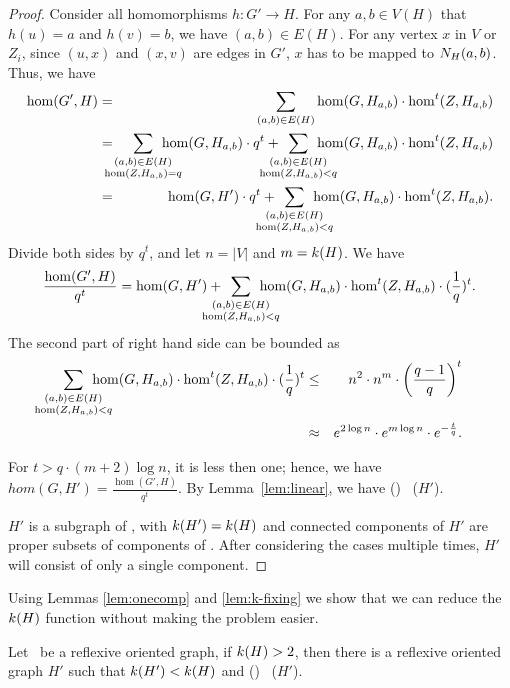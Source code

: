\begin{proof}
Consider all homomorphisms \(h: G'\to H\)\@.
For any \(a,b\in V(H)\) that \(h(u)=a\) and \(h(v)=b\), we have \((a,b)\in E(H)\)\@.
For any vertex \(x\) in \(V\) or \(Z_i\), since \((u,x)\) and \((x,v)\) are edges in \(G'\), 
\(x\) has to be mapped to \(N_{H}({a},{b})\)\@. Thus, we have
\begin{eqnarray*}
\hom(G',H) &=&
\sum_{(a,b)\in E(H)} \hom(G,H_{a,b}) \cdot \hom^t(Z, H_{a,b}) \\
&=&
\bigsum{\substack{(a,b)\in E(H)\\ \hom(Z, H_{a,b}) = q}} \hom(G, H_{a,b}) \cdot q^t + 
\bigsum{\substack{(a,b)\in E(H)\\ \hom(Z, H_{a,b}) < q}} 
\hom(G, H_{a,b}) \cdot \hom^t(Z,H_{a,b})\\
&=&
\hom(G,H') \cdot q^t + \bigsum{\substack{(a,b)\in E(H)\\ \hom(Z, H_{a,b}) < q}} 
\hom(G, H_{a,b}) \cdot \hom^t(Z,H_{a,b}).
\end{eqnarray*}
Divide both sides by \(q^t\), and let \(n=|V|\) and \(m=k(H)\)\@. We have
\[
\frac{\hom(G',H)}{q^t} = 
\hom(G,H') + 
\bigsum{\substack{(a,b)\in E(H)\\ \hom(Z, H_{a,b}) < q}} 
\hom(G, H_{a,b}) \cdot \hom^t(Z,H_{a,b}) \cdot (\frac{1}{q})^t.
\]
The second part of right hand side can be bounded as
\begin{eqnarray*}
\bigsum{\substack{(a,b)\in E(H)\\ \hom(Z, H_{a,b}) < q}} 
\hom(G, H_{a,b}) \cdot \hom^t(Z,H_{a,b}) \cdot (\frac{1}{q})^t & \le &
n^2 \cdot n^m \cdot \left(\frac{q-1}{q}\right)^t\\
& \approx & e ^ {2\log n} \cdot e^{m\log n} \cdot e^{-\frac{t}{q}}.\\
\end{eqnarray*}

For \(t > q \cdot (m+2)\log n\), it is less then one; hence, we have
\(hom(G,H')=\frac{\hom(G',H)}{q^t}\)\@. By Lemma~\ref{lem:linear},
we have \chom(\mH) \mapge\ \chom(\(H'\)). 

\(H'\) is a subgraph of \mH, with \(k(H')=k(H)\) and connected components of \(H'\)
are proper subsets of components of \mH\@. After considering the cases multiple times,
\(H'\) will consist of only a single component.
\end{proof}

Using Lemmas \ref{lem:onecomp} and \ref{lem:k-fixing} we show that we can reduce the 
\(k(H)\) function without making the problem easier.

\begin{lemma} \label{lem:k-reduction}
Let \mH\ be a reflexive oriented graph, if \(k(H) > 2\), then
there is a reflexive oriented graph \(H'\) such that \(k(H') < k(H)\)
and \chom(\mH) \mapge\ \chom(\(H'\))\@.
\end{lemma}

